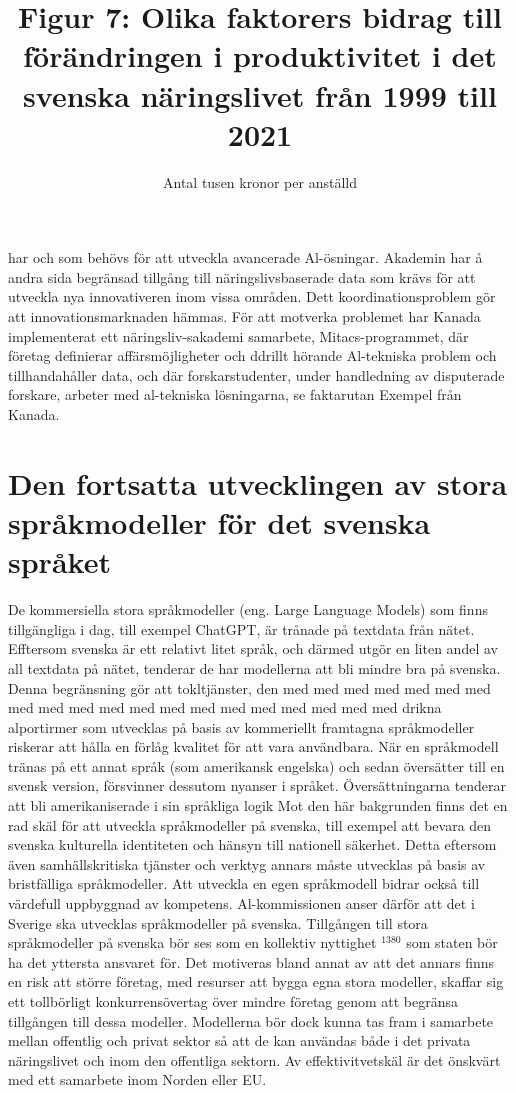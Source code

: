 {{{{{{{{{{{{{{\title{
Figur 7: Olika faktorers bidrag till förändringen i produktivitet i det svenska näringslivet från 1999 till 2021
}
\author{
Antal tusen kronor per anställd
}

har och som behövs för att utveckla avancerade Al-ösningar. Akademin har å andra sida begränsad tillgång till näringslivsbaserade data som krävs för att utveckla nya innovativeren inom vissa områden. Dett koordinationsproblem gör att innovationsmarknaden hämmas. För att motverka problemet har Kanada implementerat ett näringsliv-sakademi samarbete, Mitacs-programmet, där företag definierar affärsmöjligheter och ddrillt hörande Al-tekniska problem och tillhandahåller data, och där forskarstudenter, under handledning av disputerade forskare, arbeter med al-tekniska lösningarna, se faktarutan Exempel från Kanada.
\section*{Den fortsatta utvecklingen av stora språkmodeller för det svenska språket}
De kommersiella stora språkmodeller (eng. Large Language Models) som finns tillgängliga i dag, till exempel ChatGPT, är trånade på textdata från nätet. Efftersom svenska är ett relativt litet språk, och därmed utgör en liten andel av all textdata på nätet, tenderar de har modellerna att bli mindre bra på svenska. Denna begränsning gör att tokltjänster, den med med med med med med med med med med med med med med med med med med med med drikna alportirmer som utvecklas på basis av kommeriellt framtagna språkmodeller riskerar att hålla en förlåg kvalitet för att vara användbara. När en språkmodell tränas på ett annat språk (som amerikansk engelska) och sedan översätter till en svensk version, försvinner dessutom nyanser i språket. Översättningarna tenderar att bli amerikaniserade i sin språkliga logik
Mot den här bakgrunden finns det en rad skäl för att utveckla språkmodeller på svenska, till exempel att bevara den svenska kulturella identiteten och hänsyn till nationell säkerhet. Detta eftersom även samhällskritiska tjänster och verktyg annars måste utvecklas på basis av bristfälliga språkmodeller. Att utveckla en egen språkmodell bidrar också till värdefull uppbyggnad av kompetens. Al-kommissionen anser därför att det i Sverige ska utvecklas språkmodeller på svenska.
Tillgången till stora språkmodeller på svenska bör ses som en kollektiv nyttighet \({ }^{1380}\) som staten bör ha det yttersta ansvaret för. Det motiveras bland annat av att det annars finns en risk att större företag, med resurser att bygga egna stora modeller, skaffar sig ett tollbörligt konkurrensövertag över mindre företag genom att begränsa tillgången till dessa modeller. Modellerna bör dock kunna tas fram i samarbete mellan offentlig och privat sektor så att de kan användas både i det privata näringslivet och inom den offentliga sektorn. Av effektivitvetskäl är det önskvärt med ett samarbete inom Norden eller EU.
}}}}}}}}}}}}}}
